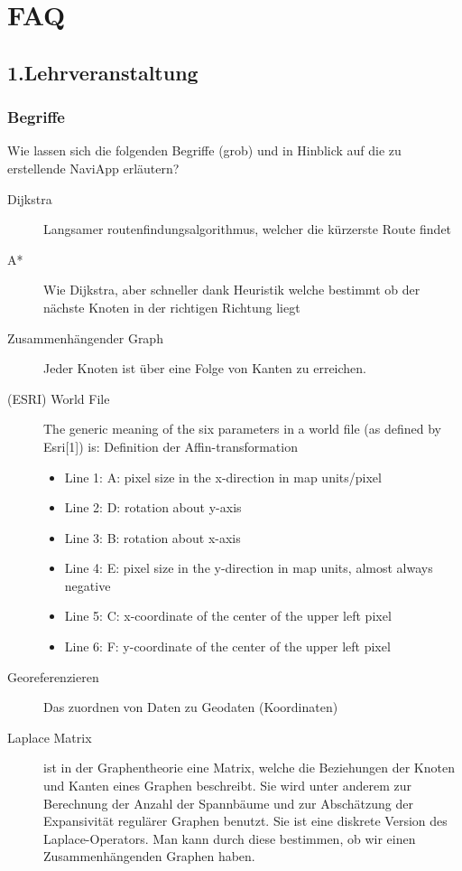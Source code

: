 \chapter{FAQ}
\label{ch:FAQ}

\section{1.Lehrveranstaltung}
\label{ch:FAQ:sec:1.Lehrveranstaltung}


\subsection{Begriffe}
Wie lassen sich die folgenden Begriffe (grob) und in Hinblick auf die zu erstellende NaviApp erläutern?

\begin{description}
	\item[Dijkstra] Langsamer routenfindungsalgorithmus, welcher die kürzerste Route findet
	\item[A*] Wie Dijkstra, aber schneller dank Heuristik welche bestimmt ob der nächste Knoten in der richtigen Richtung liegt
	\item[Zusammenhängender Graph] Jeder Knoten ist über eine Folge von Kanten zu erreichen.
	\item[(ESRI) World File] The generic meaning of the six parameters in a world file (as defined by Esri[1]) is:
Definition der Affin-transformation

\begin{itemize}
	\item Line 1: A: pixel size in the x-direction in map units/pixel
	\item Line 2: D: rotation about y-axis
	\item Line 3: B: rotation about x-axis
	\item Line 4: E: pixel size in the y-direction in map units, almost always negative
	\item Line 5: C: x-coordinate of the center of the upper left pixel
	\item Line 6: F: y-coordinate of the center of the upper left pixel
\end{itemize}

	\item [Georeferenzieren] Das zuordnen von Daten zu Geodaten (Koordinaten)
	
	\item[Laplace Matrix] ist in der Graphentheorie eine Matrix, welche die Beziehungen der Knoten und Kanten eines Graphen beschreibt. Sie wird unter anderem zur Berechnung der Anzahl der Spannbäume und zur Abschätzung der Expansivität regulärer Graphen benutzt. Sie ist eine diskrete Version des Laplace-Operators. Man kann durch diese bestimmen, ob wir einen Zusammenhängenden Graphen haben.
	

\end{description}
